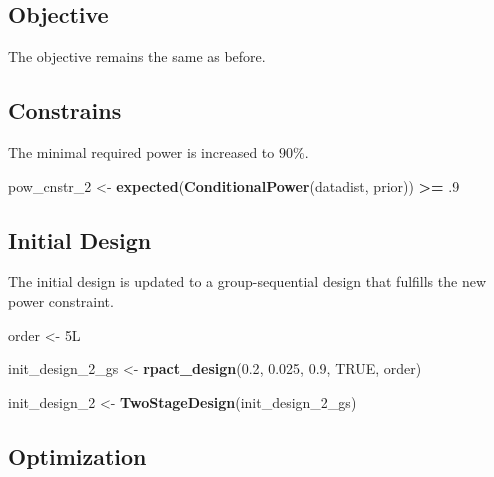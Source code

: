 \documentclass[]{book}
\newenvironment{Shaded}{\begin{snugshade}}{\end{snugshade}}
\newcommand{\DecValTok}[1]{\textcolor[rgb]{0.00,0.00,0.81}{#1}}
\newcommand{\FloatTok}[1]{\textcolor[rgb]{0.00,0.00,0.81}{#1}}
\newcommand{\KeywordTok}[1]{\textcolor[rgb]{0.13,0.29,0.53}{\textbf{#1}}}
\newcommand{\NormalTok}[1]{#1}
\newcommand{\OperatorTok}[1]{\textcolor[rgb]{0.81,0.36,0.00}{\textbf{#1}}}
\newcommand{\OtherTok}[1]{\textcolor[rgb]{0.56,0.35,0.01}{#1}}
\newcommand{\StringTok}[1]{\textcolor[rgb]{0.31,0.60,0.02}{#1}}
\begin{document}
\hypertarget{objective-8}{%
\subsection{Objective}\label{objective-8}}

The objective remains the same as before.

\hypertarget{constrains-8}{%
\subsection{Constrains}\label{constrains-8}}

The minimal required power is increased to \(90\%\).

\begin{Shaded}
\begin{Highlighting}[]
\NormalTok{pow_cnstr_}\DecValTok{2}\NormalTok{ <-}\StringTok{ }\KeywordTok{expected}\NormalTok{(}\KeywordTok{ConditionalPower}\NormalTok{(datadist, prior)) }\OperatorTok{>=}\StringTok{ }\FloatTok{.9}
\end{Highlighting}
\end{Shaded}

\hypertarget{initial-design-7}{%
\subsection{Initial Design}\label{initial-design-7}}

The initial design is updated to a group-sequential design that fulfills
the new power constraint.

\begin{Shaded}
\begin{Highlighting}[]
\NormalTok{order <-}\StringTok{ }\NormalTok{5L }

\NormalTok{init_design_}\DecValTok{2}\NormalTok{_gs <-}\StringTok{ }\KeywordTok{rpact_design}\NormalTok{(}\FloatTok{0.2}\NormalTok{, }\FloatTok{0.025}\NormalTok{, }\FloatTok{0.9}\NormalTok{, }\OtherTok{TRUE}\NormalTok{, order)}

\NormalTok{init_design_}\DecValTok{2}\NormalTok{    <-}\StringTok{ }\KeywordTok{TwoStageDesign}\NormalTok{(init_design_}\DecValTok{2}\NormalTok{_gs)}
\end{Highlighting}
\end{Shaded}

\hypertarget{optimization-7}{%
\subsection{Optimization}\label{optimization-7}}
\end{document}
